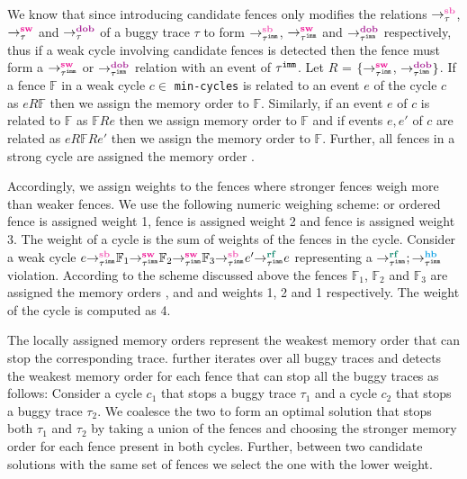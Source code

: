 We know that since introducing candidate fences only modifies
the relations $\setSB$, $\setSW$ and $\setDOB$ of a buggy trace
$\tau$ to form $\seqb{\imm{\tau}}{}{}$, $\sw{\imm{\tau}}{}{}$ 
and $\dob{\imm{\tau}}{}{}$ respectively, thus if a weak cycle
involving candidate fences is detected then the fence must form
a $\sw{\imm{\tau}}{}{}$ or $\dob{\imm{\tau}}{}{}$ relation with
an event of ${\tau}^{\mathtt{imm}}$. 
%
Let $R$ = $\{ \sw{\imm{\tau}}{}{}$, $\dob{\imm{\tau}}{}{} \}$. 
%
If a fence $\mathbb{F}$ in a weak cycle $c \in$ {\tt min-cycles} 
is related to an event $e$ of the cycle $c$ as $eR\mathbb{F}$ 
then we assign the memory order \acq to $\mathbb{F}$.
%
Similarly, if an event $e$ of $c$ is related to $\mathbb{F}$ as 
$\mathbb{F}Re$ then we assign memory order \rel to $\mathbb{F}$ 
and if events $e,e'$ of $c$ are related as $eR\mathbb{F}Re'$ then 
we assign the memory order \acqrel to $\mathbb{F}$.
%
Further, all fences in a strong cycle are assigned the memory
order \sc.

Accordingly, we assign weights to the fences where stronger 
fences weigh more than weaker fences. We use the following
numeric weighing scheme: \rel or \acq ordered fence is assigned
weight 1, \acqrel fence is assigned weight 2 and \sc fence is
assigned weight 3. The weight of a cycle is the sum of weights
of the fences in the cycle.
%
Consider a weak cycle
$\seqb{\imm{\tau}}{e}{\sw{\imm{\tau}}{\mathbb{F}_1}{\sw{\imm{\tau}}{\mathbb{F}_2}{\seqb{\imm{\tau}}{\mathbb{F}_3}{\rf{\imm{\tau}}{e'}{e}}}}}$
representing a $\rf{\imm{\tau}}{}{};\hb{\imm{\tau}}{}{}$ 
violation. According to the scheme discussed above the fences
$\mathbb{F}_1$, $\mathbb{F}_2$ and $\mathbb{F}_3$ are assigned 
the memory orders \rel, \acqrel and \acq and weights 1, 2 and 
1 respectively. The weight of the cycle is computed as 4.

The locally assigned memory orders represent the weakest 
memory order that can stop the corresponding trace. 
\ourtechnique further iterates over all buggy traces and 
detects the weakest memory order for each fence that can stop 
all the buggy traces as follows: 
%
Consider a cycle $c_1$ that stops a buggy trace $\tau_1$ and a 
cycle $c_2$ that stops a buggy trace $\tau_2$. We coalesce the
two to form an optimal solution that stops both $\tau_1$ and
$\tau_2$ by taking a union of the fences and choosing the
stronger memory order for each fence present in both cycles.
%
Further, between two candidate solutions with the same set of
fences we select the one with the lower weight.

